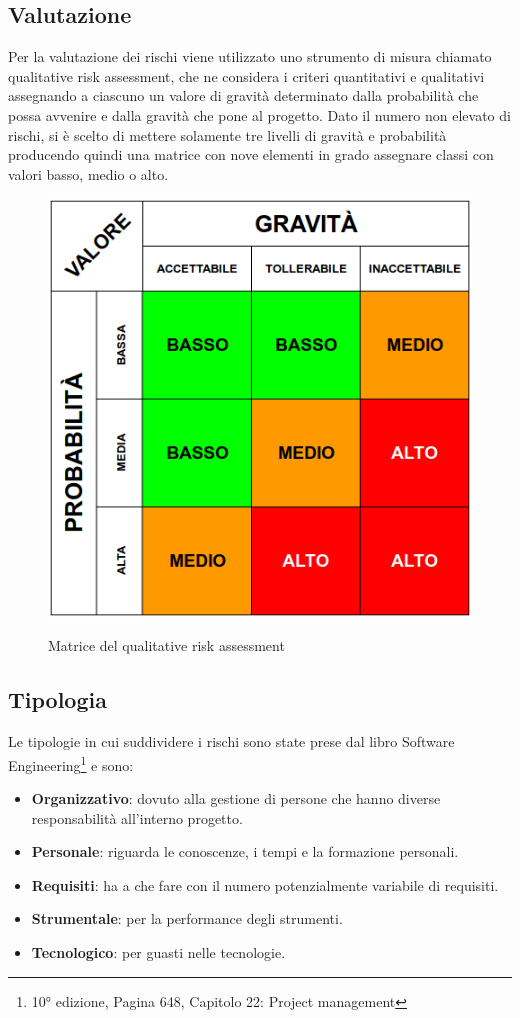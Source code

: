 	\subsection{Valutazione}
	Per la valutazione dei rischi viene utilizzato uno strumento di misura chiamato qualitative risk assessment, che ne considera i criteri quantitativi e qualitativi assegnando a ciascuno un valore di gravità determinato dalla probabilità che possa avvenire e dalla gravità che pone al progetto.
	Dato il numero non elevato di rischi, si è scelto di mettere solamente tre livelli di gravità e probabilità producendo quindi una matrice con nove elementi in grado assegnare classi con valori basso, medio o alto.
	\begin{figure}[H]
		\centering
		\includegraphics[scale=0.6]{img/risk_assessment_table.png}\\
		\caption{Matrice del qualitative risk assessment}
	\end{figure}
	\subsection{Tipologia}
	Le tipologie in cui suddividere i rischi sono state prese dal libro Software Engineering\footnote{10° edizione, Pagina 648, Capitolo 22: Project management} e sono:
	\begin{itemize}
 		\item \textbf{Organizzativo}: dovuto alla gestione di persone che hanno diverse responsabilità all'interno progetto.
		\item \textbf{Personale}: riguarda le conoscenze, i tempi e la formazione personali.
		\item \textbf{Requisiti}: ha a che fare con il numero potenzialmente variabile di requisiti.
		\item \textbf{Strumentale}: per la performance degli strumenti.
		\item \textbf{Tecnologico}: per guasti nelle tecnologie.
	\end{itemize}
